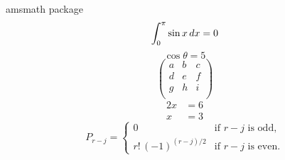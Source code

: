 \documentclass{article}
\begin{document}
amsmath package
$$ \int_0^\pi \sin x \mathop{dx} = 0 $$
\begin{equation}
    \cos \theta = 5
\end{equation}
\begin{equation}
    \begin{pmatrix}
        a & b & c \\
        d & e & f \\
        g & h & i \\
    \end{pmatrix}
\end{equation}
\begin{align}
    2 x &= 6 \\
      x &= 3
\end{align}
\begin{equation}
    P_{r-j} =
    \begin{cases}
        0 & \text{if $r-j$ is odd},\\
        r!\,(-1)^{(r-j)/2} & \text{if $r-j$ is even}.
    \end{cases}
\end{equation}
\end{document}
